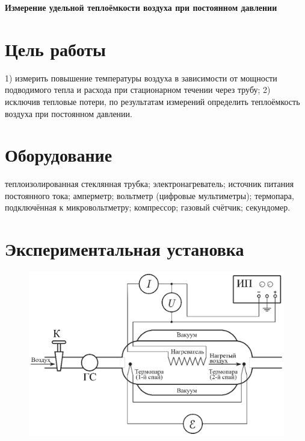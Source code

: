 \documentclass[a4paper, fontsize=14pt]{article}
\begin{document}
\parindent=1cm


\huge
\centering
\textbf{Измерение удельной теплоёмкости воздуха при постоянном давлении}

\raggedright
\large
\section*{Цель работы}
1) измерить повышение температуры воздуха в зависимости от мощности подводимого тепла и расхода при стационарном течении через трубу; 
2) исключив тепловые потери, по результатам измерений определить теплоёмкость воздуха при постоянном давлении.
\section*{Оборудование}
теплоизолированная стеклянная трубка; электронагреватель; источник питания постоянного тока; амперметр; вольтметр (цифровые мультиметры); термопара, подключённая к микровольтметру; компрессор; газовый счётчик; секундомер.
\section*{Экспериментальная установка}
\begin{figure}[H]
\center
\includegraphics[scale=0.2]{asd.png}
\end{figure}
\end{document}
